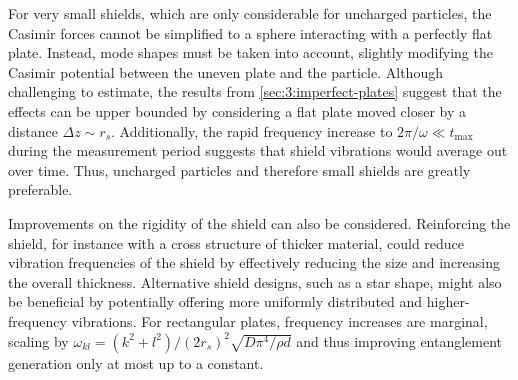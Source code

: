 For very small shields, which are only considerable for uncharged particles, the Casimir forces cannot be simplified to a sphere interacting with a perfectly flat plate.
Instead, mode shapes must be taken into account, slightly modifying the Casimir potential between the uneven plate and the particle.
Although challenging to estimate, the results from \cref{sec:3:imperfect-plates} suggest that the effects can be upper bounded by considering a flat plate moved closer by a distance $\Delta z \sim r_s$.
Additionally, the rapid frequency increase to $2\pi/\omega \ll t_\mathrm{max}$ during the measurement period suggests that shield vibrations would average out over time.
Thus, uncharged particles and therefore small shields are greatly preferable.

Improvements on the rigidity of the shield can also be considered. 
Reinforcing the shield, for instance with a cross structure of thicker material, could reduce vibration frequencies of the shield by effectively reducing the size and increasing the overall thickness.
Alternative shield designs, such as a star shape, might also be beneficial by potentially offering more uniformly distributed and higher-frequency vibrations. For rectangular plates, frequency increases are marginal, scaling by $\omega_{kl} = (k^2 + l^2)/(2r_s)^2 \sqrt{D \pi^4 / \rho d}$ \cite[p. 471-474]{Rao_2019} and thus improving entanglement generation only at most up to a constant.